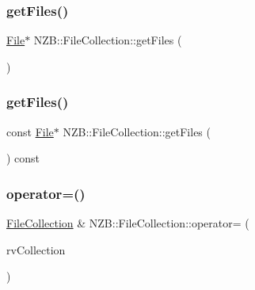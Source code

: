 \subsubsection{\texorpdfstring{get\+Files()}{getFiles()}\hspace{0.1cm}{\footnotesize\ttfamily [1/2]}}
{\footnotesize\ttfamily \hyperlink{class_n_z_b_1_1_file}{File}$\ast$ N\+Z\+B\+::\+File\+Collection\+::get\+Files (\begin{DoxyParamCaption}{ }\end{DoxyParamCaption})\hspace{0.3cm}{\ttfamily [inline]}}

\hypertarget{class_n_z_b_1_1_file_collection_a8b13dca0410b84a05aaeabe7e819b8cd}{}\label{class_n_z_b_1_1_file_collection_a8b13dca0410b84a05aaeabe7e819b8cd} 
\subsubsection{\texorpdfstring{get\+Files()}{getFiles()}\hspace{0.1cm}{\footnotesize\ttfamily [2/2]}}
{\footnotesize\ttfamily const \hyperlink{class_n_z_b_1_1_file}{File}$\ast$ N\+Z\+B\+::\+File\+Collection\+::get\+Files (\begin{DoxyParamCaption}{ }\end{DoxyParamCaption}) const\hspace{0.3cm}{\ttfamily [inline]}}

\hypertarget{class_n_z_b_1_1_file_collection_a974ea8d9e7851511eddf7c6bbb82741f}{}\label{class_n_z_b_1_1_file_collection_a974ea8d9e7851511eddf7c6bbb82741f} 
\subsubsection{\texorpdfstring{operator=()}{operator=()}\hspace{0.1cm}{\footnotesize\ttfamily [1/2]}}
{\footnotesize\ttfamily \hyperlink{class_n_z_b_1_1_file_collection}{File\+Collection} \& N\+Z\+B\+::\+File\+Collection\+::operator= (\begin{DoxyParamCaption}\item[{\hyperlink{class_n_z_b_1_1_file_collection}{File\+Collection} \&\&}]{rv\+Collection }\end{DoxyParamCaption})}

